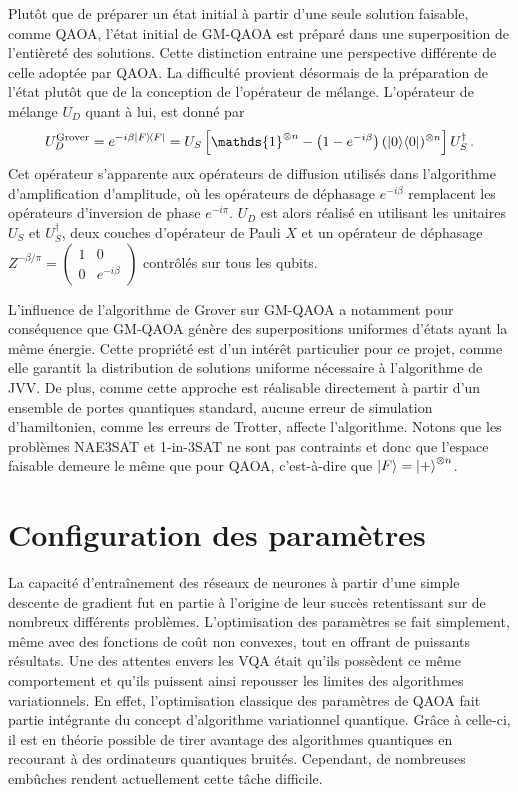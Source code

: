 Plutôt que de préparer un état initial à partir d'une seule solution faisable, comme QAOA, l'état initial de GM-QAOA est préparé dans une superposition de l'entièreté des solutions. Cette distinction entraine une perspective différente de celle adoptée par QAOA. La difficulté provient désormais de la préparation de l'état plutôt que de la conception de l'opérateur de mélange. L'opérateur de mélange $U_{D}$ quant à lui, est donné par
\begin{equation}
    U_D^{\mathrm{Grover}} = e^{-i \beta \ket{F}\!\bra{F}} = U_{S}\left[ \mathds{1}^{\otimes n} -\left(1-e^{-i \beta}\right) (\ket{0}\!\bra{0})^{\otimes n} \right] U_{S}^{\dagger} \,.
\end{equation}
Cet opérateur s'apparente aux opérateurs de diffusion utilisés dans l'algorithme d'amplification d'amplitude, où les opérateurs de déphasage $e^{-i\beta}$ remplacent les opérateurs d'inversion de phase $e^{-i \pi}$. $U_{D}$ est alors réalisé en utilisant les unitaires $U_{S}$ et $U_{S}^{\dagger}$, deux couches d'opérateur de Pauli $X$ et un opérateur de déphasage $Z^{-\beta/\pi} = \begin{pmatrix}
1 & 0 \\
0 & e^{-i\beta}
\end{pmatrix}$ contrôlés sur tous les qubits.

L'influence de l'algorithme de Grover sur GM-QAOA a notamment pour conséquence que GM-QAOA génère des superpositions uniformes d'états ayant la même énergie. Cette propriété est d'un intérêt particulier pour ce projet, comme elle garantit la distribution de solutions uniforme nécessaire à l'algorithme de JVV. De plus, comme cette approche est réalisable directement à partir d'un ensemble de portes quantiques standard, aucune erreur de simulation d'hamiltonien, comme les erreurs de Trotter, affecte l'algorithme. Notons que les problèmes NAE3SAT et 1-in-3SAT ne sont pas contraints et donc que l'espace faisable demeure le même que pour QAOA, c'est-à-dire que $\ket{F} = \ket{+}^{\otimes n}$.


\section{Configuration des paramètres}
\label{subsec:configuration-des-parametres}

La capacité d'entraînement des réseaux de neurones à partir d'une simple descente de gradient fut en partie à l'origine de leur succès retentissant sur de nombreux différents problèmes. L'optimisation des paramètres se fait simplement, même avec des fonctions de coût non convexes, tout en offrant de puissants résultats. Une des attentes envers les VQA était qu'ils possèdent ce même comportement et qu'ils puissent ainsi repousser les limites des algorithmes variationnels. En effet, l'optimisation classique des paramètres de QAOA fait partie intégrante du concept d'algorithme variationnel quantique. Grâce à celle-ci, il est en théorie possible de tirer avantage des algorithmes quantiques en recourant à des ordinateurs quantiques bruités. Cependant, de nombreuses embûches rendent actuellement cette tâche difficile. 

